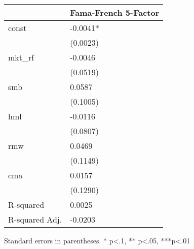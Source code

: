 \begin{table}
\caption{}
\label{}
\begin{center}
\begin{tabular}{ll}
\hline
               & Fama-French 5-Factor  \\
\hline
const          & -0.0041*              \\
               & (0.0023)              \\
mkt\_rf        & -0.0046               \\
               & (0.0519)              \\
smb            & 0.0587                \\
               & (0.1005)              \\
hml            & -0.0116               \\
               & (0.0807)              \\
rmw            & 0.0469                \\
               & (0.1149)              \\
cma            & 0.0157                \\
               & (0.1290)              \\
R-squared      & 0.0025                \\
R-squared Adj. & -0.0203               \\
\hline
\end{tabular}
\end{center}
\end{table}
\bigskip
Standard errors in parentheses. \newline 
* p<.1, ** p<.05, ***p<.01